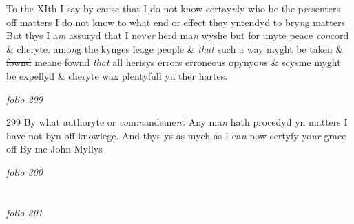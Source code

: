 \documentclass[12pt, a4paper]{book}
\begin{document}
				\marginpar[\vspace{0.5cm}{\textcolor{Gray}{11}}]{}
			 To the XIth I say by cause that I do not know certay\textit{n}ly who be the p\textit{re}senters off matters I do not know
			 to what end or effect they yntendyd to bry\textit{n}g matters But thys I a\textit{m} assuryd that I nev\textit{er} herd ma\textit{n} wyshe but for unyte peace \textit{con}cord \& cheryte.  amo\textit{n}g the kynges leage people \& \textit{that} such a way myght be taken \& \sout{fownd }meane fownd \textit{that} all herisys errors erroneous opynyo\textit{n}s \& scysme myght be expellyd \& cheryte wax plentyfull yn ther hartes. 

\dotfill
					

\textit{folio 299}


{\color{Mahogany}299} 
				\marginpar[\vspace{0.5cm}{\textcolor{Gray}{12}}]{}
			 By what authoryte or \textit{co}m\textit{m}andeme\textit{n}t Any ma\textit{n} hath procedyd yn matters I have not byn off knowlege. And thys ys as mych as I ca\textit{n} now certyfy yo\textit{ur} grace off  By me John Myllys

\dotfill
					

\textit{folio 300}


         \vspace{4cm}
         
\dotfill
					  \section*{}  \subsection*{}

\textit{folio 301}
\end{document}
